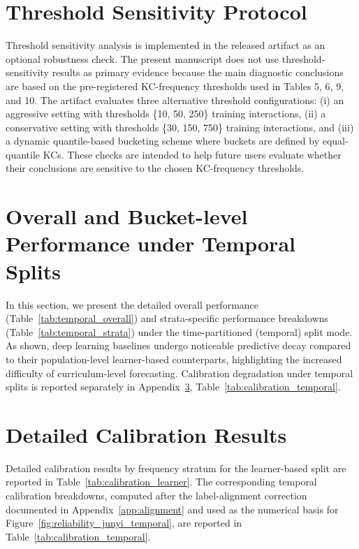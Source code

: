 \section{Threshold Sensitivity Protocol}
\label{app:sensitivity}
Threshold sensitivity analysis is implemented in the released artifact as an optional robustness check. The present manuscript does not use threshold-sensitivity results as primary evidence because the main diagnostic conclusions are based on the pre-registered KC-frequency thresholds used in Tables 5, 6, 9, and 10. The artifact evaluates three alternative threshold configurations: (i) an aggressive setting with thresholds \{10, 50, 250\} training interactions, (ii) a conservative setting with thresholds \{30, 150, 750\} training interactions, and (iii) a dynamic quantile-based bucketing scheme where buckets are defined by equal-quantile KCs. These checks are intended to help future users evaluate whether their conclusions are sensitive to the chosen KC-frequency thresholds.

\FloatBarrier

\section{Overall and Bucket-level Performance under Temporal Splits}
\label{app:temporal_performance}
In this section, we present the detailed overall performance (Table~\ref{tab:temporal_overall}) and strata-specific performance breakdowns (Table~\ref{tab:temporal_strata}) under the time-partitioned (temporal) split mode. As shown, deep learning baselines undergo noticeable predictive decay compared to their population-level learner-based counterparts, highlighting the increased difficulty of curriculum-level forecasting. Calibration degradation under temporal splits is reported separately in Appendix~\ref{app:calibration_performance}, Table~\ref{tab:calibration_temporal}.




\clearpage
\section{Detailed Calibration Results}
\label{app:calibration_performance}
Detailed calibration results by frequency stratum for the learner-based split are reported in Table~\ref{tab:calibration_learner}. The corresponding temporal calibration breakdowns, computed after the label-alignment correction documented in Appendix~\ref{app:alignment} and used as the numerical basis for Figure~\ref{fig:reliability_junyi_temporal}, are reported in Table~\ref{tab:calibration_temporal}.

